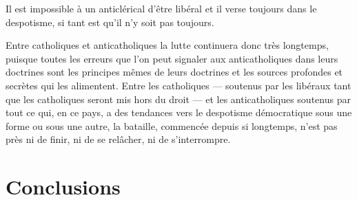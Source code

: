 \documentclass[french,twoside]{book} %
\begin{document}
Il est impossible à un anticlérical d’être libéral et il verse toujours dans le despotisme, si tant est qu’il n’y soit pas toujours.\par
 Entre catholiques et anticatholiques la lutte continuera donc très longtemps, puisque toutes les erreurs que l’on peut signaler aux anticatholiques dans leurs doctrines sont les principes mêmes de leurs doctrines et les sources profondes et secrètes qui les alimentent. Entre les catholiques — soutenus par les libéraux tant que les catholiques seront mis hors du droit — et les anticatholiques soutenus par tout ce qui, en ce pays, a des tendances vers le despotisme démocratique sous une forme ou sous une autre, la bataille, commencée depuis si longtemps, n’est pas près ni de finir, ni de se relâcher, ni de s’interrompre.
 \section[{Conclusions}]{Conclusions}\renewcommand{\leftmark}{Conclusions}
\end{document}
